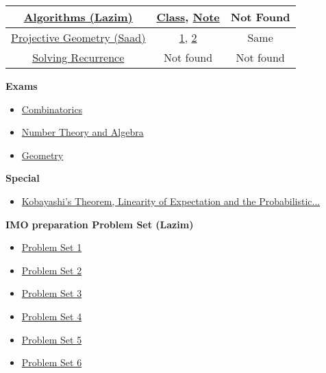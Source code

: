 \documentclass{article}
\begin{document}
\begin{center}
\begin{tabular}{|c|c|c|}
			\hline 
			\href{https://www.youtube.com/watch?v=VjXhzp-hYoE}{Algorithms (Lazim)} & \href{https://drive.google.com/file/d/1p0i6hqSbMrBuEjdoiQCPlfXQlBMAtMJ3/view}{Class}, \href{https://drive.google.com/file/d/1KeTtY-0IxhPWDcDFvvau15P9_OEyCuq_/view}{Note} & Not Found \\
			\hline 
			\href{https://www.youtube.com/watch?v=P4FN_-LOEx4}{Projective Geometry (Saad)} & \href{https://drive.google.com/file/d/1MfmQFOs-N120PnhCfIheByLBQKbua9Jl/view}{1}, \href{https://drive.google.com/file/d/14VtTlUP3GvV1vjV_Njt5o0TbSzBvfE0-/view}{2} & Same \\
			\hline 
			\href{https://www.youtube.com/watch?v=Jh8VFmv5_s4}{Solving Recurrence } & Not found & Not found \\
			\hline 
		\end{tabular} 
	\end{center}
	\vspace{.5 cm}
	\textbf{Exams}
	\begin{itemize}
		\item \href{https://drive.google.com/file/d/1tu6UKZj4x-KOPgCbEauQ6iH3Dbb0q5L1/view}{Combinatorics} 
		\item \href{https://drive.google.com/file/d/1Af5VmNKJBZozeH0Bl_xJBOtDuspniAlw/view}{Number Theory and Algebra} 
		\item \href{https://drive.google.com/file/d/1zdWs66MRHcBq4OXi4tnd9jzptWGBzInK/view}{Geometry}
	\end{itemize}
	
	\textbf{Special}
	\begin{itemize}
		\item \href{https://www.youtube.com/watch?v=uffz6cNcsHU}{Kobayashi's Theorem, Linearity of Expectation and the Probabilistic...} 
	\end{itemize}

	\textbf{IMO preparation Problem Set (Lazim)}
	\begin{itemize}
		\item \href{https://drive.google.com/file/d/1B1xvsDU159nrHlo4exArrx7DL5cdPOtt/view?usp=sharing}{Problem Set 1}
		\item \href{https://drive.google.com/file/d/1BHr1Q6sSfQIvXUum5gM3v1wFZc8_-0H4/view?usp=sharing}{Problem Set 2}
		\item \href{https://drive.google.com/file/d/12QiWO7Q7ac19BiFCqyVDyaaeP5qCrOrb/view?usp=sharing}{Problem Set 3}
		\item \href{https://drive.google.com/file/d/1hGYGX_Xa-imZ3B-NH76BEmOV2z31smkd/view?usp=sharing}{Problem Set 4}
		\item \href{https://drive.google.com/file/d/1FlPP7cSw_CBh5CJ7iN2Ml0VGUSZjaOcp/view?usp=sharing}{Problem Set 5}
		\item \href{https://drive.google.com/file/d/1vSohi2c9lUvdn6mt-rNeudjlxraJzLXW/view?usp=sharing}{Problem Set 6}
		
		
	\end{itemize}
\end{document}
